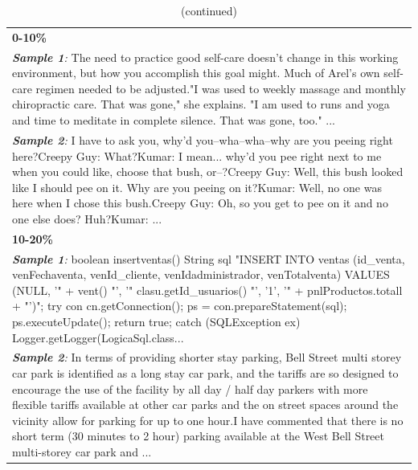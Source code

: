 \documentclass[11pt]{article}
\begin{document}
\begin{longtable}{p{15cm}}
\caption{Samples are divided into 10 PD quantiles, with two samples representing each quantile.}
\label{PD_quantiles} \\
\toprule
\midrule
\endfirsthead

\caption[]{(continued)} \\
\toprule
\midrule
\endhead

\midrule
\endfoot

\bottomrule
\endlastfoot

\small \textbf{0-10\%} \\
\midrule
\small \textit{\textbf{Sample 1}:} The need to practice good self-care doesn't change in this working environment, but how you accomplish this goal might. Much of Arel's own self-care regimen needed to be adjusted."I was used to weekly massage and monthly chiropractic care. That was gone," she explains. "I am used to runs and yoga and time to meditate in complete silence. That was gone, too." ... \\
\small \textit{\textbf{Sample 2}:} I have to ask you, why'd you--wha--wha--why are you peeing right here?Creepy Guy: What?Kumar: I mean... why'd you pee right next to me when you could like, choose that bush, or--?Creepy Guy: Well, this bush looked like I should pee on it. Why are you peeing on it?Kumar: Well, no one was here when I chose this bush.Creepy Guy: Oh, so you get to pee on it and no one else does? Huh?Kumar: ... \\
\midrule
\small \textbf{10-20\%} \\
\midrule
\small \textit{\textbf{Sample 1}:} boolean insertventas() String sql "INSERT INTO ventas (id\_venta, venFechaventa, venId\_cliente, venIdadministrador, venTotalventa) VALUES (NULL, '" + vent() "', '" clasu.getId\_usuarios() "', '1', '" + pnlProductos.totall + "')"; try con cn.getConnection(); ps = con.prepareStatement(sql); ps.executeUpdate(); return true; catch (SQLException ex) Logger.getLogger(LogicaSql.class... \\
\small \textit{\textbf{Sample 2}:} In terms of providing shorter stay parking, Bell Street multi storey car park is identified as a long stay car park, and the tariffs are so designed to encourage the use of the facility by all day / half day parkers with more flexible tariffs available at other car parks and the on street spaces around the vicinity allow for parking for up to one hour.I have commented that there is no short term (30 minutes to 2 hour) parking available at the West Bell Street multi-storey car park and ... \\

\end{longtable}
\end{document}
